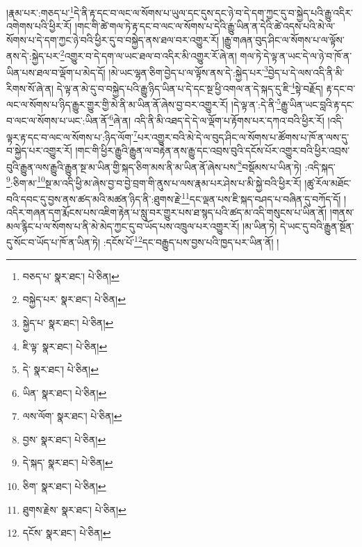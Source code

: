 །རྣམ་པར་:གཅད་པ་\footnote{བཅད་པ་  སྣར་ཐང་།  པེ་ཅིན། }དེ་ནི་རྟ་དང་བ་ལང་ལ་སོགས་པ་ཡུལ་དང་དུས་དང་ཉེ་བ་དེ་དག་ཀྱང་དུ་བ་སྐྱེད་པའི་རྒྱུ་འདིར་འགེགས་པའི་ཕྱིར་རོ། །གང་གི་ཚེ་གལ་ཏེ་རྟ་དང་བ་ལང་ལ་སོགས་པ་དེའི་རྒྱུ་ཡིན་ན་དེའི་ཚེ་འདས་པའི་མེ་ལ་སོགས་པ་དེ་དག་ཀྱང་ཉེ་བའི་ཕྱིར་དུ་བ་བསྐྱེད་ནས་ཐལ་བར་འགྱུར་རོ། །རྒྱུ་གཞན་བུད་ཤིང་ལ་སོགས་པ་ལ་ལྟོས་ནས་དེ་:སྐྱེད་པར་\footnote{བསྐྱེད་པར་  སྣར་ཐང་།  པེ་ཅིན། }འགྱུར་བ་དེ་དག་ལ་ཡང་ཐལ་བ་འདིར་མི་འགྱུར་རོ་ཞེ་ན། གལ་ཏེ་དེ་ལྟ་ན་ཡང་དེ་ལ་ཉེ་བ་ཁོ་ན་ཡིན་པས་ཐལ་བ་ལྡོག་པ་མེད་དོ། །མེ་ཡང་ལྷན་ཅིག་བྱེད་པ་ལ་ལྟོས་ནས་དེ་:སྐྱེད་པར་\footnote{སྐྱེད་པ་  སྣར་ཐང་།  པེ་ཅིན། }བྱེད་པ་དེ་ལས་འདི་ནི་མི་རིགས་སོ་ཞེ་ན། དེ་ལྟ་ན་མེ་དུ་བ་བསྐྱེད་པའི་རྒྱུ་ཉིད་ཡིན་པ་དེ་དང་སྔ་ཕྱི་འགལ་ན་དེ་སྐད་དུ་ཇི་\footnote{ཇི་ལྟ་  སྣར་ཐང་།  པེ་ཅིན། }སྟེ་བརྗོད། རྟ་དང་བ་ལང་ལ་སོགས་པ་ཉིད་རྒྱུར་གྱུར་གྱི་མེ་ནི་མ་ཡིན་ནོ་ཞེས་བྱ་བར་འགྱུར་རོ། །དེ་ལྟ་ན་:དེ་ནི་\footnote{དེ་  སྣར་ཐང་།  པེ་ཅིན། }རྒྱུ་ཡིན་ཡང་བླའི་རྟ་དང་བ་ལང་ལ་སོགས་པ་ཡང་:ཡིན་ནོ་\footnote{ཡིན་  སྣར་ཐང་།  པེ་ཅིན། }ཞེ་ན། འདི་ནི་མི་འཐད་དེ་དེ་ལ་ལྡོག་པ་རྟོགས་པར་དཀའ་བའི་ཕྱིར་རོ། །འདི་ལྟར་རྟ་དང་བ་ལང་ལ་སོགས་པ་:ཉིད་ལོག་\footnote{ལས་ལོག་  སྣར་ཐང་།  པེ་ཅིན། }པར་འགྱུར་བའི་མེ་དེ་ལ་བུད་ཤིང་ལ་སོགས་པ་ཚོགས་པ་ཁོ་ན་ལས་དུ་བ་སྐྱེད་པར་འགྱུར་རོ། །གང་གི་ཕྱིར་རྒྱུའི་རྒྱུན་ལ་བརྟེན་ནས་རྒྱུ་དང་འབྲས་བུའི་དངོས་པོར་འགྱུར་བའི་ཕྱིར་འབྲས་བུའི་རྒྱུན་ལས་རྒྱུའི་རྒྱུན་སྔ་མ་ཡིན་གྱི་སྐད་ཅིག་མས་ནི་མ་ཡིན་ནོ་ཞེས་པས་\footnote{བྱས་  སྣར་ཐང་།  པེ་ཅིན། }བསྡོམས་པ་ཡིན་ཏེ། :འདི་སྐད་\footnote{དེ་སྐད་  སྣར་ཐང་།  པེ་ཅིན། }:ཅིག་མ་\footnote{ཅིག་  སྣར་ཐང་།  པེ་ཅིན། }སྔ་མ་འདི་ཕྱི་མ་ཞེས་བྱ་བ་བྱེ་བྲག་གི་ནུས་པ་ལས་རྣམ་པར་ཤེས་པ་མི་སྐྱེ་བའི་ཕྱིར་རོ། །ཚུ་རོལ་མཐོང་བའི་དབང་དུ་བྱས་ནས་ཚད་མའི་མཚན་ཉིད་ནི་:ཐུགས་རྗེ་\footnote{ཐུགས་རྗེས་  སྣར་ཐང་།  པེ་ཅིན། }དང་ལྡན་པས་ཇི་སྐད་བཤད་པ་བཞིན་དུ་བཀོད་དོ། །འདིར་གཞན་དག་རྨོངས་པས་འཇིག་རྟེན་པ་སླུ་བར་གྱུར་པས་ཐ་སྙད་པའི་ཚད་མ་འདི་གསུངས་པ་ཡིན་ནོ། །གནས་མལ་རྙིང་པ་ལ་སོགས་པ་ནི་མེ་མེད་ཀྱང་དུ་བ་ཡོད་པས་འཁྲུལ་པར་འགྱུར་རོ། །མ་ཡིན་ཏེ། དེ་ཡང་དུ་བའི་རྒྱུན་སྔོན་དུ་སོང་བ་ཡོད་པ་ཁོ་ན་ཡིན་ཏེ། :དངོས་པོ་\footnote{དངོས་  སྣར་ཐང་།  པེ་ཅིན། }དང་བརྒྱུད་པས་བྱས་པའི་ཁྱད་པར་ཡིན་ནོ། །
